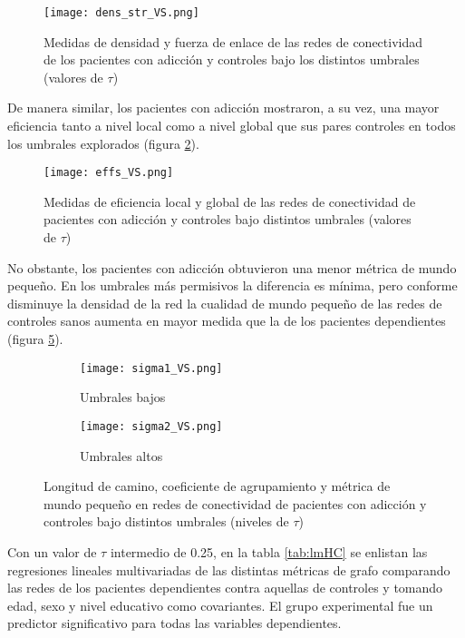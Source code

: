 \begin{figure}[!ht]
    \centering
    \texttt{[image: dens\_str\_VS.png]}
    \caption{Medidas de densidad y fuerza de enlace de las redes de conectividad  de los pacientes con adicción y controles bajo los distintos umbrales (valores de $\tau$)}
    \label{fig:dsHC}
\end{figure}

De manera similar, los pacientes con adicción mostraron, a su vez, una mayor eficiencia tanto a nivel local como a nivel global que sus pares controles en todos los umbrales explorados (figura \ref{fig:effHC}).

\begin{figure}[!ht]
    \centering
    \texttt{[image: effs\_VS.png]}
    \caption{Medidas de eficiencia local y global de las redes de conectividad de pacientes con adicción y controles bajo distintos umbrales (valores de $\tau$)}
    \label{fig:effHC}
\end{figure}

No obstante, los pacientes con adicción obtuvieron una menor métrica de mundo pequeño.
En los umbrales más permisivos la diferencia es mínima, pero conforme disminuye la densidad de la red la cualidad de mundo pequeño de las redes de controles sanos aumenta en mayor medida que la de los pacientes dependientes (figura \ref{fig:sigmaHC}).

\begin{figure}[!ht]
    \centering
    \begin{subfigure}[t]{0.8\textwidth}
        \centering
        \texttt{[image: sigma1\_VS.png]}
        \caption{Umbrales bajos}
        \label{fig:sigma1}
    \end{subfigure}
    \begin{subfigure}[t]{0.8\textwidth}
        \centering
        \texttt{[image: sigma2\_VS.png]}
        \caption{Umbrales altos}
        \label{fig:sigma2}
    \end{subfigure}
    \caption{Longitud de camino, coeficiente de agrupamiento y métrica de mundo pequeño en redes de conectividad de pacientes con adicción y controles bajo distintos umbrales (niveles de $\tau$)}
    \label{fig:sigmaHC}
\end{figure}

Con un valor de $\tau$ intermedio de 0.25, en la tabla \ref{tab:lmHC} se enlistan las regresiones lineales multivariadas de las distintas métricas de grafo comparando las redes de los pacientes dependientes contra aquellas de controles y tomando edad, sexo y nivel educativo como covariantes. El grupo experimental fue un predictor significativo para todas las variables dependientes.

